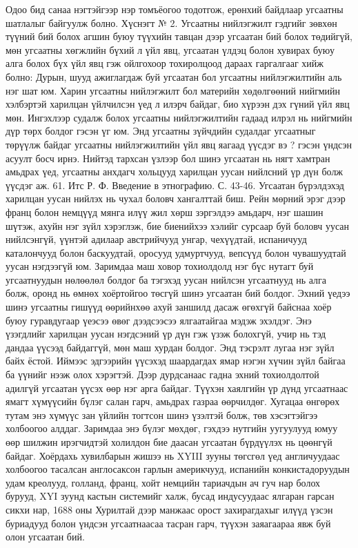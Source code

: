 Одоо бид санаа нэгтэйгээр нэр томъёогоо тодотгож, ерөнхий байдлаар угсаатны шатлалыг байгуулж болно.
Хүснэгт № 2.
Угсаатны нийлэгжилт гэдгийг зөвхөн түүний бий болох агшин буюу түүхийн тавцан дээр угсаатан бий болох төдийгүй, мөн угсаатны хөгжлийн бүхий л үйл явц, угсаатан үлдэц болон хувирах буюу алга болох бүх үйл явц гэж ойлгохоор тохиролцоод дараах гаргалгааг хийж болно: Дурын, шууд ажиглагдаж буй угсаатан бол угсаатны нийлэгжилтийн аль нэг шат юм. Харин угсаатны нийлэгжилт бол материйн хөдөлгөөний нийгмийн хэлбэртэй харилцан үйлчилсэн үед л илэрч байдаг, био хүрээн дэх гүний үйл явц мөн. Ингэхлээр судалж болох угсаатны нийлэгжилтийн гадаад илрэл нь нийгмийн дүр төрх болдог гэсэн үг юм.
Энд угсаатны зүйчдийн судалдаг угсаатныг төрүүлж байдаг угсаатны нийлэгжилтийн үйл явц яагаад үүсдэг вэ ? гэсэн үндсэн асуулт босч ирнэ. Нийтэд тархсан үзлээр бол шинэ угсаатан нь нягт хамтран амьдрах үед, угсаатны анхдагч хольцууд харилцан уусан нийлсний үр дүн болж үүсдэг аж. 61. Итс Р. Ф. Введение в этнографию. С. 43-46.
Угсаатан бүрэлдэхэд харилцан уусан нийлэх нь чухал боловч хангалттай биш. Рейн мөрний эрэг дээр франц болон немцүүд мянга илүү жил хөрш зэргэлдээ амьдарч, нэг шашин шүтэж, ахуйн нэг зүйл хэрэглэж, бие биенийхээ хэлийг сурсаар буй боловч уусан нийлсэнгүй, үүнтэй адилаар австрийчууд унгар, чехүүдтай, испаничууд каталончууд болон баскуудтай, оросууд удмуртчууд, вепсүүд болон чувашуудтай уусан нэгдээгүй юм.
Заримдаа маш ховор тохиолдолд нэг бүс нутагт буй угсаатнуудын нөлөөлөл болдог ба тэгэхэд уусан нийлсэн угсаатнууд нь алга болж, оронд нь өмнөх хоёртойгоо төсгүй шинэ угсаатан бий болдог. Эхний үедээ шинэ угсаатны гишүүд өөрийнхөө ахуй заншилд дасаж өгөхгүй байснаа хоёр буюу гуравдугаар үеэсээ өвөг дээдсээсээ ялгаатайгаа мэдэж эхэлдэг. Энэ үзэгдлийг харилцан уусан нэгдсэний үр дүн гэж үзэж болохгүй, учир нь тэд дандаа үүсээд байдаггүй, мөн маш хурдан болдог. Энд тэсрэлт лугаа нэг зүйл байх ёстой. Иймээс эдгээрийн үүсэхэд шаардагдах ямар нэгэн хүчин зүйл байгаа ба үүнийг нээж олох хэрэгтэй.
Дээр дурдсанаас гадна эхний тохиолдолтой адилгүй угсаатан үүсэх өөр нэг арга байдаг. Түүхэн хаялгийн үр дүнд угсаатнаас ямагт хүмүүсийн бүлэг салан гарч, амьдрах газраа өөрчилдөг. Хугацаа өнгөрөх тутам энэ хүмүүс зан үйлийн тогтсон шинэ үзэлтэй болж, төв хэсэгтэйгээ холбоогоо алддаг. Заримдаа энэ бүлэг мөхдөг, гэхдээ нутгийн уугуулууд юмуу өөр шилжин ирэгчидтэй холилдон бие даасан угсаатан бүрдүүлэх нь цөөнгүй байдаг.
Хоёрдахь хувилбарын жишээ нь XYIII зууны төгсгөл үед англичуудаас холбоогоо тасалсан англосаксон гарлын америкчууд, испанийн конкистадоруудын удам креолууд, голланд, франц, хойт немцийн тариачдын ач гуч нар болох бурууд, XYI зуунд кастын системийг халж, бусад индусуудаас ялгаран гарсан сикхи нар, 1688 оны Хурилтай дээр манжаас орост захирагдахыг илүүд үзсэн буриадууд болон үндсэн угсаатнаасаа тасран гарч, түүхэн заяагаараа явж буй олон угсаатан бий.
